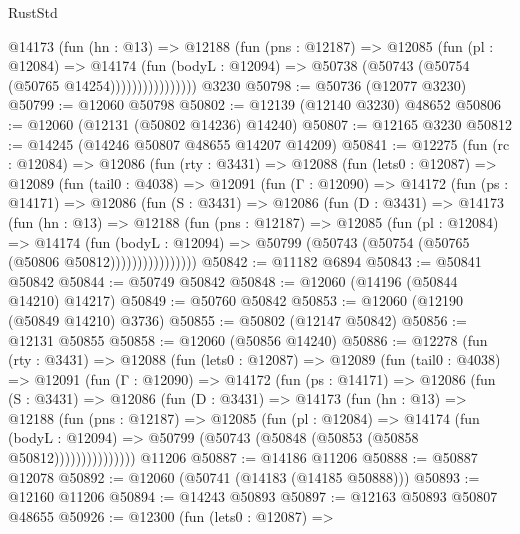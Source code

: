 \begin{lexlean}{RustStd}
\begin{coremodule}
                    @14173
                      (fun (hn : @13) =>
                      @12188
                        (fun (pns : @12187) =>
                        @12085
                          (fun (pl : @12084) =>
                          @14174
                            (fun (bodyL : @12094) =>
                            @50738 (@50743 (@50754 (@50765 @14254))))))))))))))))
    @3230
@50798 := @50736 (@12077 @3230)
@50799 := @12060 @50798
@50802 := @12139 (@12140 @3230) @48652
@50806 := @12060 (@12131 (@50802 @14236) @14240)
@50807 := @12165 @3230
@50812 := @14245 (@14246 @50807 @48655 @14207 @14209)
@50841 := @12275
    (fun (rc : @12084) =>
    @12086
      (fun (rty : @3431) =>
      @12088
        (fun (lets0 : @12087) =>
        @12089
          (fun (tail0 : @4038) =>
          @12091
            (fun (Γ : @12090) =>
            @14172
              (fun (ps : @14171) =>
              @12086
                (fun (S : @3431) =>
                @12086
                  (fun (D : @3431) =>
                  @14173
                    (fun (hn : @13) =>
                    @12188
                      (fun (pns : @12187) =>
                      @12085
                        (fun (pl : @12084) =>
                        @14174
                          (fun (bodyL : @12094) =>
                          @50799 (@50743 (@50754 (@50765 (@50806 @50812))))))))))))))))
@50842 := @11182 @6894
@50843 := @50841 @50842
@50844 := @50749 @50842
@50848 := @12060 (@14196 (@50844 @14210) @14217)
@50849 := @50760 @50842
@50853 := @12060 (@12190 (@50849 @14210) @3736)
@50855 := @50802 (@12147 @50842)
@50856 := @12131 @50855
@50858 := @12060 (@50856 @14240)
@50886 := @12278
    (fun (rty : @3431) =>
    @12088
      (fun (lets0 : @12087) =>
      @12089
        (fun (tail0 : @4038) =>
        @12091
          (fun (Γ : @12090) =>
          @14172
            (fun (ps : @14171) =>
            @12086
              (fun (S : @3431) =>
              @12086
                (fun (D : @3431) =>
                @14173
                  (fun (hn : @13) =>
                  @12188
                    (fun (pns : @12187) =>
                    @12085
                      (fun (pl : @12084) =>
                      @14174
                        (fun (bodyL : @12094) =>
                        @50799 (@50743 (@50848 (@50853 (@50858 @50812)))))))))))))))
    @11206
@50887 := @14186 @11206
@50888 := @50887 @12078
@50892 := @12060 (@50741 (@14183 (@14185 @50888)))
@50893 := @12160 @11206
@50894 := @14243 @50893
@50897 := @12163 @50893 @50807 @48655
@50926 := @12300
    (fun (lets0 : @12087) =>

\end{coremodule}
\end{lexlean}
